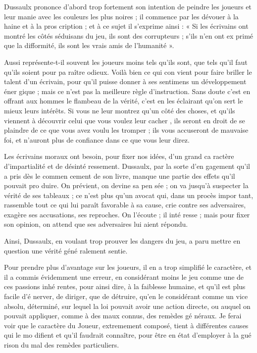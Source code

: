 Dussaulx prononce d'abord trop
fortement son intention de peindre
les joueurs et leur manie avec les
couleurs les plus noires ; il commence
par les dévouer à la haine et à la pros%
cription ; et à ce sujet il s'exprime
ainsi : « Si les écrivains ont montré
les côtés séduisans du jeu, ils sont
des corrupteurs ; s'ils n'en ont ex%
primé que la difformité, ils sont
les vrais amis de l'humanité ».

Aussi représente-t-il souvent les
joueurs moins tels qu'ils sont, que
tels qu'il faut qu'ils soient pour pa%
raître odieux. Voilà bien ce qui con%
vient pour faire briller le talent d'un
écrivain, pour qu'il puisse donner à
ses sentimens un développement éner%
gique ; mais ce n'est pas la meilleure
règle d'instruction. Sans doute c'est
en offrant aux hommes le flambeau
de la vérité, c'est en les éclairant qu'on
sert le mieux leurs intérêts. Si vous ne
leur montrez qu'un côté des choses,
et qu'ils viennent à découvrir celui
que vous voulez leur cacher , ils
seront en droit de se plaindre de ce
que vous avez voulu les tromper ; ils
vous accuseront de mauvaise foi, et
n'auront plus de confiance dans ce
que vous leur direz.

Les écrivains moraux ont besoin,
pour fixer nos idées, d'un grand ca%
ractère d'impartialité et de désinté%
ressement. Dussaulx, par la sorte d'en%
gagement qu'il a pris dès le commen%
cement de son livre, manque une
partie des effets qu'il pouvait pro%
duire. On prévient, on devine sa pen%
sée ; on va jusqu'à suspecter la vérité
de ses tableaux ; ce n'est plus qu'un
avocat qui, dans un procès impor%
tant, rassemble tout ce qui lui paraît
favorable à sa cause, crie contre ses
adversaires, exagère ses accusations,
ses reproches. On l'écoute ; il inté%
resse ; mais pour fixer son opinion,
on attend que ses adversaires lui aient
répondu.

Ainsi, Dussaulx, en voulant trop
prouver les dangers du jeu, a paru
mettre en question une vérité géné%
ralement sentie.

Pour prendre plus d'avantage sur
les joueurs, il en a trop simplifié le
caractère, et il a commis évidemment
une erreur, en considérant moins le
jeu comme une de ces passions inhé%
rentes, pour ainsi dire, à la faiblesse
humaine, et qu'il est plus facile d'é%
nerver, de diriger, que de détruire,
qu'en le considérant comme un vice
absolu, déterminé, sur lequel la loi
pouvait avoir une action directe, ou
auquel on pouvait appliquer, comme
à des maux connus, des remèdes gé%
néraux. Je ferai voir que le caractère
du Joueur, extremement composé,
tient à différentes causes qui le mo%
difient et qu'il faudrait connaître,
pour être en état d'employer à la gué%
rison du mal des remèdes particuliers.

